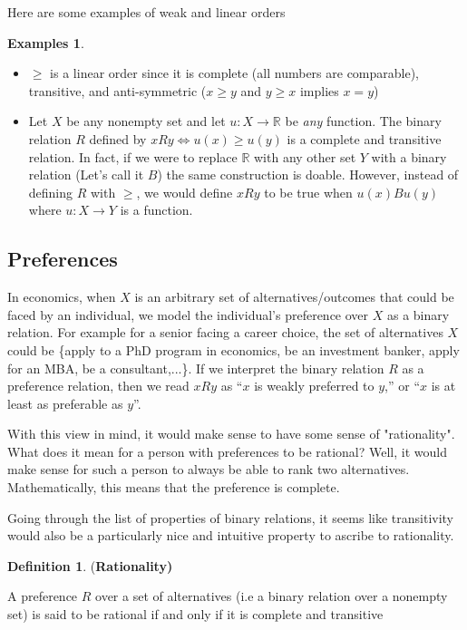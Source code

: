 \documentclass[12pt]{article}
\theoremstyle{plain}
\theoremstyle{definition}
\newtheorem{defin}{Definition}[subsection]
\newtheorem{unex}[ex]{Examples}
\theoremstyle{remark}
\newcommand{\tn}[1]{\textnormal{#1}}
\newcommand{\3}{\vspace*{3mm}}
\newcommand{\name}[1]{\tn{(\textbf{#1)}}}
\newcommand{\RR}{\mathbb{R}}
\newcommand{\IFF}{\Longleftrightarrow}
\begin{document}
Here are some examples of weak and linear orders 

\begin{unex}
\
\begin{itemize}
\item $\geq$ is a linear order since it is complete (all numbers are comparable), transitive, and anti-symmetric ($x \geq y $ and $y \geq x$ implies $x = y$)
\item Let $X$ be any nonempty set and let $u:X \to \RR$ be \emph{any} function. The binary relation $R$ defined by $x R y \IFF u(x) \geq u(y)$ is a complete and transitive relation. In fact, if we were to replace $\RR$ with any other set $Y$ with a binary relation (Let's call it $B$) the same construction is doable. However, instead of defining $R$ with $\geq$, we would define $x R y$ to be true when $u(x) B u(y)$ where $u: X \to Y$ is a function. 
\end{itemize}
\end{unex}

\subsection{Preferences}

In economics, when $X$ is an arbitrary set of alternatives/outcomes that could be faced by an individual, we model the individual’s preference over $X$ as a binary relation. For example for a senior facing a career choice, the set of alternatives $X$ could be \{apply to a PhD program in economics, be an investment banker, apply for an MBA, be a consultant,...\}. If we interpret the binary relation $R$ as a preference relation, then we read $xRy$ as “$x$ is weakly preferred to $y$,” or “$x$ is at least as preferable as $y$”. 

With this view in mind, it would make sense to have some sense of "rationality". What does it mean for a person with preferences to be rational? Well, it would make sense for such a person to always be able to rank two alternatives. Mathematically, this means that the preference is complete. 

Going through the list of properties of binary relations, it seems like transitivity would also be a particularly nice and intuitive property to ascribe to rationality. 

\begin{defin} \name{Rationality}

A preference $R$ over a set of alternatives (i.e a binary relation over a nonempty set) is said to be rational if and only if it is complete and transitive 

\end{defin}
\end{document}
